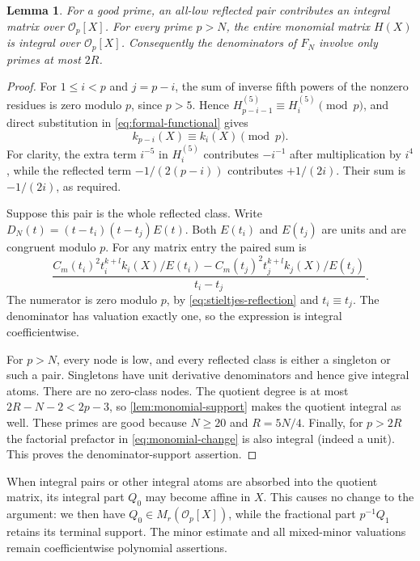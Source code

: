\documentclass[11pt,letterpaper]{article}
\newtheorem{lemma}[lemma]{Lemma}
\theoremstyle{definition}
\begin{document}
\begin{lemma}\label{lem:large-prime-integrality}
For a good prime, an all-low reflected pair contributes an integral matrix over
$\mathcal O_p[X]$. For every prime $p>N$, the entire monomial matrix
$H(X)$ is integral over $\mathcal O_p[X]$. Consequently the
denominators of $F_N$ involve only primes at most $2R$.
\end{lemma}
\begin{proof}
For $1\le i<p$ and $j=p-i$, the sum of inverse fifth powers of
the nonzero residues is zero modulo $p$, since $p>5$. Hence
$H_{p-i-1}^{(5)}\equiv H_i^{(5)}\pmod p$, and direct substitution
in \eqref{eq:formal-functional} gives
\begin{equation}\label{eq:stieltjes-reflection}
 k_{p-i}(X)\equiv k_i(X)\pmod p.
\end{equation}
For clarity, the extra term $i^{-5}$ in $H_i^{(5)}$ contributes
$-i^{-1}$ after multiplication by $i^4$, while the reflected term
$-1/(2(p-i))$ contributes $+1/(2i)$. Their sum is $-1/(2i)$,
as required.

Suppose this pair is the whole reflected class. Write
$D_N(t)=(t-t_i)(t-t_j)E(t)$. Both $E(t_i)$ and $E(t_j)$ are units
and are congruent modulo $p$. For any matrix entry the paired sum is
\[
 \frac{C_m(t_i)^2t_i^{k+l}k_i(X)/E(t_i)
       -C_m(t_j)^2t_j^{k+l}k_j(X)/E(t_j)}{t_i-t_j}.
\]
The numerator is zero modulo $p$, by \eqref{eq:stieltjes-reflection}
and $t_i\equiv t_j$. The denominator has valuation exactly one,
so the expression is integral coefficientwise.

For $p>N$, every node is low, and every reflected class is either
a singleton or such a pair. Singletons have unit derivative
denominators and hence give integral atoms. There are no zero-class
nodes. The quotient degree is at most
$2R-N-2<2p-3$, so \cref{lem:monomial-support} makes the quotient
integral as well. These primes are good because $N\ge20$ and
$R=5N/4$. Finally, for $p>2R$ the factorial prefactor in
\eqref{eq:monomial-change} is also integral (indeed a unit).
This proves the denominator-support assertion.
\end{proof}

When integral pairs or other integral atoms are absorbed into the
quotient matrix, its integral part $Q_0$ may become affine in $X$.
This causes no change to the argument: we then have
$Q_0\in M_r(\mathcal O_p[X])$, while the fractional part $p^{-1}Q_1$
retains its terminal support. The minor estimate and all mixed-minor
valuations remain coefficientwise polynomial assertions.
\end{document}
